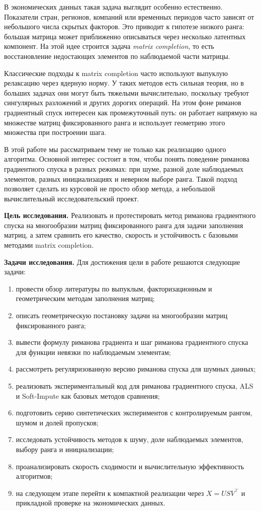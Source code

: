 \documentclass[a4paper,12pt]{article}
\begin{document}
В экономических данных такая задача выглядит особенно естественно. Показатели стран, регионов, компаний или временных периодов часто зависят от небольшого числа скрытых факторов. Это приводит к гипотезе низкого ранга: большая матрица может приближенно описываться через несколько латентных компонент. На этой идее строится задача \textit{matrix completion}, то есть восстановление недостающих элементов по наблюдаемой части матрицы.

Классические подходы к matrix completion часто используют выпуклую релаксацию через ядерную норму. У таких методов есть сильная теория, но в больших задачах они могут быть тяжелыми вычислительно, поскольку требуют сингулярных разложений и других дорогих операций. На этом фоне риманов градиентный спуск интересен как промежуточный путь: он работает напрямую на множестве матриц фиксированного ранга и использует геометрию этого множества при построении шага.

В этой работе мы рассматриваем тему не только как реализацию одного алгоритма. Основной интерес состоит в том, чтобы понять поведение риманова градиентного спуска в разных режимах: при шуме, разной доле наблюдаемых элементов, разных инициализациях и неверном выборе ранга. Такой подход позволяет сделать из курсовой не просто обзор метода, а небольшой вычислительный исследовательский проект.

\textbf{Цель исследования.} Реализовать и протестировать метод риманова градиентного спуска на многообразии матриц фиксированного ранга для задачи заполнения матриц, а затем сравнить его качество, скорость и устойчивость с базовыми методами matrix completion.

\textbf{Задачи исследования.} Для достижения цели в работе решаются следующие задачи:
\begin{enumerate}[label=\arabic*.]
    \item провести обзор литературы по выпуклым, факторизационным и геометрическим методам заполнения матриц;
    \item описать геометрическую постановку задачи на многообразии матриц фиксированного ранга;
    \item вывести формулу риманова градиента и шаг риманова градиентного спуска для функции невязки по наблюдаемым элементам;
    \item рассмотреть регуляризованную версию риманова спуска для шумных данных;
    \item реализовать экспериментальный код для риманова градиентного спуска, ALS и Soft-Impute как базовых методов сравнения;
    \item подготовить серию синтетических экспериментов с контролируемым рангом, шумом и долей пропусков;
    \item исследовать устойчивость методов к шуму, доле наблюдаемых элементов, выбору ранга и инициализации;
    \item проанализировать скорость сходимости и вычислительную эффективность алгоритмов;
    \item на следующем этапе перейти к компактной реализации через $X=USV^\top$ и прикладной проверке на экономических данных.
\end{enumerate}
\end{document}
